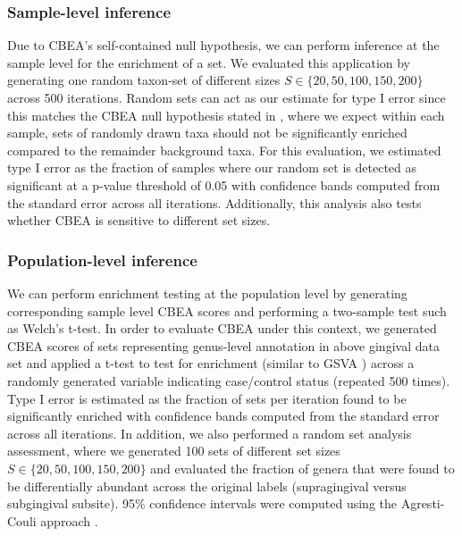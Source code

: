 \subsubsection{Sample-level inference} 
Due to CBEA's self-contained null hypothesis, we can perform inference at the sample level for the enrichment of a set. We evaluated this application by generating one random taxon-set of different sizes $S \in \{20, 50, 100, 150, 200\}$ across 500 iterations. Random sets can act as our estimate for type I error since this matches the CBEA null hypothesis stated in , where we expect within each sample, sets of randomly drawn taxa should not be significantly enriched compared to the remainder background taxa. For this evaluation, we estimated type I error as the fraction of samples where our random set is detected as significant at a p-value threshold of 0.05 with confidence bands computed from the standard error across all iterations.  Additionally, this analysis also tests whether CBEA is sensitive to different set sizes.  

\subsubsection{Population-level inference} 
We can perform enrichment testing at the population level by generating corresponding sample level CBEA scores and performing a two-sample test such as Welch's t-test. In order to evaluate CBEA under this context, we generated CBEA scores of sets representing genus-level annotation in above gingival data set \cite{consortium2012, proctor2019} and applied a t-test to test for enrichment (similar to GSVA \cite{hanzelmann2013}) across a randomly generated variable indicating case/control status (repeated 500 times). Type I error is estimated as the fraction of sets per iteration found to be significantly enriched with confidence bands computed from the standard error across all iterations. In addition, we also performed a random set analysis assessment, where we generated 100 sets of different set sizes $S \in \{20, 50, 100, 150, 200\}$ and evaluated the fraction of genera that were found to be differentially abundant across the original labels (supragingival versus subgingival subsite). 95\% confidence intervals were computed using the Agresti-Couli approach \cite{agresti1998}.  

